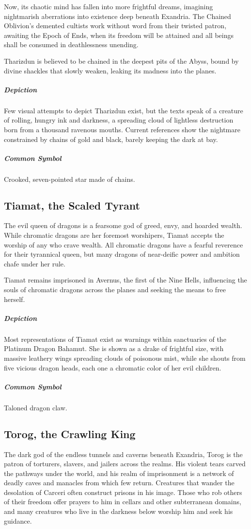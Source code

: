 \documentclass[letterpaper, twocolumn, openany, nodeprecatedcode, layout=true]{dndbook}
\begin{document}
Now, its chaotic mind has fallen into more frightful dreams, imagining nightmarish
aberrations into existence deep beneath Exandria. The Chained Oblivion’s demented cultists
work without word from their twisted patron, awaiting the Epoch of Ends, when its freedom will
be attained and all beings shall be consumed in deathlessness unending.

Tharizdun is believed to be chained in the deepest pits of the Abyss, bound by divine shackles
that slowly weaken, leaking its madness into the planes.

\subparagraph{Depiction}
Few visual attempts to depict Tharizdun exist, but the texts speak of a creature of rolling,
hungry ink and darkness, a spreading cloud of lightless destruction born from a thousand
ravenous mouths. Current references show the nightmare constrained by chains of gold and
black, barely keeping the dark at bay.

\subparagraph{Common Symbol}
Crooked, seven-pointed star made of chains.

\subsection{Tiamat, the Scaled Tyrant}

The evil queen of dragons is a fearsome god of greed, envy, and hoarded wealth. While
chromatic dragons are her foremost worshipers, Tiamat accepts the worship of any who
crave wealth. All chromatic dragons have a fearful reverence for their tyrannical queen,
but many dragons of near-deific power and ambition chafe under her rule.

Tiamat remains imprisoned in Avernus, the first of the Nine Hells, influencing the souls
of chromatic dragons across the planes and seeking the means to free herself.

\subparagraph{Depiction}
Most representations of Tiamat exist as warnings within sanctuaries of the Platinum Dragon
Bahamut. She is shown as a drake of frightful size, with massive leathery wings spreading
clouds of poisonous mist, while she shouts from five vicious dragon heads, each one a chromatic
color of her evil children.

\subparagraph{Common Symbol}
Taloned dragon claw.

\subsection{Torog, the Crawling King}

The dark god of the endless tunnels and caverns beneath Exandria, Torog is the patron of
torturers, slavers, and jailers across the realms. His violent tears carved the pathways
under the world, and his realm of imprisonment is a network of deadly caves and manacles
from which few return. Creatures that wander the desolation of Carceri often construct prisons
in his image. Those who rob others of their freedom offer prayers to him in cellars and other
subterranean domains, and many creatures who live in the darkness below worship him and seek
his guidance.
\end{document}
